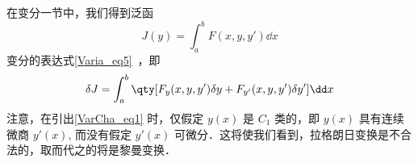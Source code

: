 
在变分一节中，我们得到泛函 
\begin{equation}
J(y)=\int_a^bF(x,y,y')\dd x
\end{equation}
变分的表达式\autoref{Varia_eq5}~，即
\begin{equation}\label{VarCha_eq1}
\delta J=\int_a^b\qty[F_y(x,y,y')\delta y+F_{y'}(x,y,y')\delta y']\dd x
\end{equation}
注意，在引出\autoref{VarCha_eq1} 时，仅假定 $y(x)$ 是 $C_1$ 类的，即 $y(x)$ 具有连续微商 $y'(x)$, 而没有假定 $y'(x)$ 可微分．这将使我们看到，拉格朗日变换是不合法的，取而代之的将是黎曼变换． 